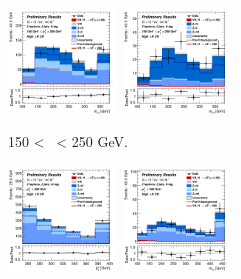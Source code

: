 \begin{figure}[h!]
\begin{subfigure}[b]{\textwidth}
        \includegraphics[width=0.32\textwidth]{Images/VH/Own_fit/postfit_VHcc/Region_distmBB_BMax250_BMin150_DCRHigh_J2_TTypelt_T2_L2_Y6051_GlobalFit_conditionnal_mu1.png}
        \includegraphics[width=0.32\textwidth]{Images/VH/Own_fit/postfit_VHcc/Region_distmBB_BMax250_BMin150_DCRHigh_J2_TTypett_T2_L2_Y6051_GlobalFit_conditionnal_mu1.png}
        \caption{150 < \ptv\ < 250 GeV.}
        \label{fig:plots_VHcc_2L_150_CRH_2J}
    \end{subfigure}
    \begin{subfigure}[b]{\textwidth}
        \centering
        \includegraphics[width=0.32\textwidth]{Images/VH/Own_fit/postfit_VHcc/Region_distpTV_BMin250_DCRHigh_J2_TTypent_T1_L2_Y6051_GlobalFit_conditionnal_mu1.png}
        \includegraphics[width=0.32\textwidth]{Images/VH/Own_fit/postfit_VHcc/Region_distmBB_BMin250_DCRHigh_J2_TTypelt_T2_L2_Y6051_GlobalFit_conditionnal_mu1.png}

\end{subfigure}
\end{figure}
